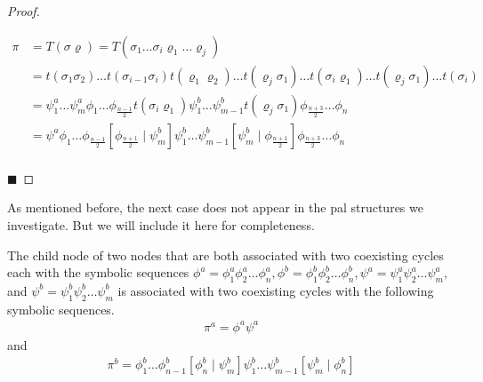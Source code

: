 \begin{proof}
\begin{enumerate}
\begin{align*}
			      \pi & = T(\sigma\varrho) = T(\sigma_1 \dots \sigma_i \varrho_1 \dots \varrho_j)                                                                                             \\
			          & =
			      t(\sigma_1\sigma_2) \dots t(\sigma_{i-1}\sigma_i) t(\varrho_1\varrho_2) \dots t(\varrho_j \sigma_1) \dots t(\sigma_i\varrho_1) \dots t(\varrho_j\sigma_1) \dots t(\sigma_i) \\
			          & =
			      \psi^a_1 \dots \psi^a_m
			      \phi_1 \dots \phi_{\frac{n-1}{2}} t(\sigma_i \varrho_1)
			      \psi^b_1 \dots \psi^b_{m-1} t(\varrho_j \sigma_1)
			      \phi_{\frac{n+3}{2}} \dots \phi_n                                                                                                                                           \\
			          & =
			      \psi^a
			      \phi_1 \dots \phi_{\frac{n-1}{2}} \left[\phi_{\frac{n+1}{2}} \mid \psi^b_m\right]
			      \psi^b_1 \dots \psi^b_{m-1} \left[\psi^b_m \mid \phi_{\frac{n+1}{2}}\right]
			      \phi_{\frac{n+3}{2}} \dots \phi_n                                                                                                                                           \\
		      \end{align*}
	\end{enumerate}
	\hfill $\blacksquare$
\end{proof}

\clearpage

As mentioned before, the next case does not appear in the \gls{pal} structures we investigate.
But we will include it here for completeness.

\begin{theorem}
	\label{theorem:child.symbolic.3}
	The child node of two nodes that are both associated with two coexisting cycles each with the symbolic sequences $\phi^a = \phi^a_1\phi^a_2\dots\phi^a_n, \phi^b = \phi^b_1\phi^b_2\dots\phi^b_n, \psi^a = \psi^a_1\psi^a_2\dots\psi^a_m,$ and $\psi^b = \psi^b_1\psi^b_2\dots\psi^b_m$ is associated with two coexisting cycles with the following symbolic sequences.
	\begin{align}
		\pi^a = \phi^a\psi^a
	\end{align}
	and
	\begin{align}
		\pi^b = \phi^b_1 \dots \phi^b_{n-1} \left[\phi^b_n \mid \psi^b_m\right] \psi^b_1 \dots \psi^b_{m-1} \left[\psi^b_m \mid \phi^b_n\right]
	\end{align}
\end{theorem}

